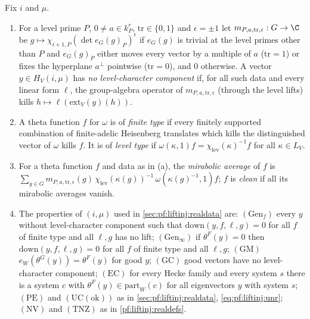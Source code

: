 \begin{definition}\label{pf:stageU:downdefs}
Fix $i$ and $\mu$.
\begin{enumerate}[label=(\alph*)]
\item For a level prime $P$, $0\ne a\in k_P^r$, $\mathrm{tr}\in\{0,1\}$ and $\epsilon=\pm1$ let $m_{P,a,\mathrm{tr},\epsilon}:G\to\C$ be
$g\mapsto\chi_{i+1,P}(\det e_G(g)_P)^{\epsilon}$ if $e_G(g)$ is trivial at the level primes other than $P$ and $e_G(g)_P$ either moves
every vector by a multiple of $a$ ($\mathrm{tr}=1$) or fixes the hyperplane $a^\perp$ pointwise ($\mathrm{tr}=0$), and $0$ otherwise.
A vector $y\in H_V(i,\mu)$ has \emph{no level-character component} if, for all such data and every linear form $\ell$, the
group-algebra operator of $m_{P,a,\mathrm{tr},\epsilon}$ (through the level lifts) kills $h\mapsto\ell(\mathrm{ext}_V(y)(h))$.
\item A theta function $f$ for $\omega$ is of \emph{finite type} if every finitely supported combination of finite-adelic
Heisenberg translates which kills the distinguished vector of $\omega$ kills $f$. It is of \emph{level type} if
$\omega(\kappa,1)f=\chi_{\mathrm{lev}}(\kappa)^{-1}f$ for all $\kappa\in L_V$.
\item For a theta function $f$ and data as in (a), the \emph{mirabolic average} of $f$ is
$\sum_{g\in G}m_{P,a,\mathrm{tr},\epsilon}(g)\,\chi_{\mathrm{lev}}(\kappa(g))^{-1}\,\omega(\kappa(g)^{-1},1)f$; $f$ is \emph{clean} if all its
mirabolic averages vanish.
\item The properties of $(i,\mu)$ used in \cref{sec:pf:liftinj:realdata} are: $(\mathrm{Gen}_f)$ every $y$ without level-character
component such that $\mathrm{down}(y,f,\ell,g)=0$ for all $f$ of finite type and all $\ell,g$ has no lift; $(\mathrm{Gen}_\infty)$ if
$\theta^F(y)=0$ then $\mathrm{down}(y,f,\ell,g)=0$ for all $f$ of finite type and all $\ell,g$; $(\mathrm{GM})$ $e_W(\theta^G(y))=\theta^F(y)$
for good $y$; $(\mathrm{GC})$ good vectors have no level-character component; $(\mathrm{EC})$ for every Hecke family and every system
$s$ there is a system $c$ with $\theta^F(y)\in\mathrm{part}_W(c)$ for all eigenvectors $y$ with system $s$; $(\mathrm{PE})$ and
$(\mathrm{UC}(\mathrm{ok}))$ as in \cref{sec:pf:liftinj:realdata}, \eqref{eq:pf:liftinj:unr}; $(\mathrm{NV})$ and $(\mathrm{TNZ})$ as in
\cref{pf:liftinj:realdefs}.
\end{enumerate}
\end{definition}

